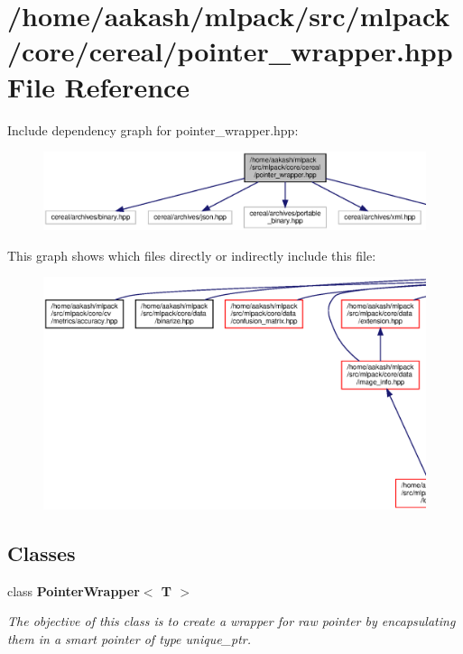 \section{/home/aakash/mlpack/src/mlpack/core/cereal/pointer\+\_\+wrapper.hpp File Reference}
\label{pointer__wrapper_8hpp}
Include dependency graph for pointer\+\_\+wrapper.\+hpp\+:
\nopagebreak
\begin{figure}[H]
\begin{center}
\leavevmode
\includegraphics[width=350pt]{pointer__wrapper_8hpp__incl}
\end{center}
\end{figure}
This graph shows which files directly or indirectly include this file\+:
\nopagebreak
\begin{figure}[H]
\begin{center}
\leavevmode
\includegraphics[width=350pt]{pointer__wrapper_8hpp__dep__incl}
\end{center}
\end{figure}
\subsection*{Classes}
\begin{DoxyCompactItemize}
\item 
class \textbf{ Pointer\+Wrapper$<$ T $>$}
\begin{DoxyCompactList}\small\item\em The objective of this class is to create a wrapper for raw pointer by encapsulating them in a smart pointer of type unique\+\_\+ptr. \end{DoxyCompactList}\end{DoxyCompactItemize}
